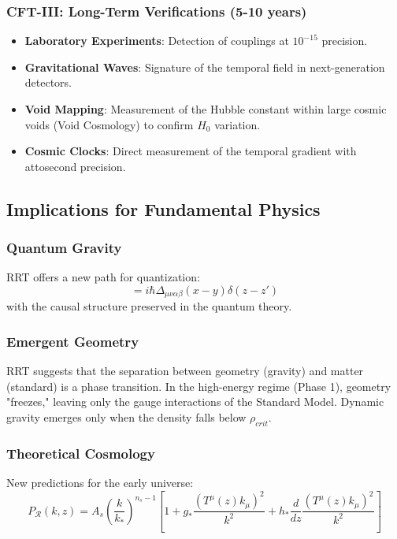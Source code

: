 \documentclass[12pt,a4paper]{article}
\begin{document}
\subsubsection{CFT-III: Long-Term Verifications (5-10 years)}
\begin{itemize}
    \item \textbf{Laboratory Experiments}: Detection of couplings at $10^{-15}$ precision.
    \item \textbf{Gravitational Waves}: Signature of the temporal field in next-generation detectors.
    \item \textbf{Void Mapping}: Measurement of the Hubble constant within large cosmic voids (Void Cosmology) to confirm $H_0$ variation.
    \item \textbf{Cosmic Clocks}: Direct measurement of the temporal gradient with attosecond precision.
\end{itemize}

\subsection{Implications for Fundamental Physics}

\subsubsection{Quantum Gravity}
RRT offers a new path for quantization:
\begin{equation}
    [\hat{\mathcal{T}}_{\mu\nu}(x, z), \hat{g}_{\alpha\beta}(y, z')] = i\hbar \Delta_{\mu\nu\alpha\beta}(x-y) \delta(z-z')
\end{equation}
with the causal structure preserved in the quantum theory.

\subsubsection{Emergent Geometry}
RRT suggests that the separation between geometry (gravity) and matter (standard) is a phase transition. In the high-energy regime (Phase 1), geometry "freezes," leaving only the gauge interactions of the Standard Model. Dynamic gravity emerges only when the density falls below $\rho_{crit}$.

\subsubsection{Theoretical Cosmology}
New predictions for the early universe:
\begin{equation}
    P_{\mathcal{R}}(k, z) = A_s \left( \frac{k}{k_*} \right)^{n_s-1} \left[ 1 + g_* \frac{(T^\mu(z) k_\mu)^2}{k^2} + h_* \frac{d}{dz} \frac{(T^\mu(z) k_\mu)^2}{k^2} \right]
\end{equation}
\end{document}
